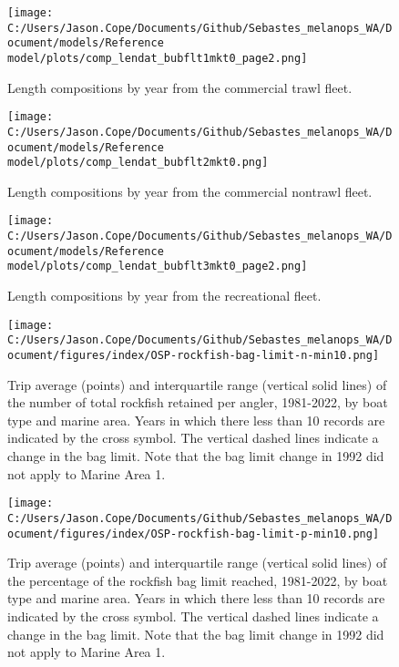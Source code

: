 \documentclass[11pt,
  english,
  letterpaper,
]{article}
\begin{document}
\pagebreak

\begin{figure}
\centering
\texttt{[image: C:/Users/Jason.Cope/Documents/Github/Sebastes\_melanops\_WA/Document/models/Reference model/plots/comp\_lendat\_bubflt1mkt0\_page2.png]}
\caption{Length compositions by year from the commercial trawl fleet.\label{fig:trawl-length-comps}}
\end{figure}

\pagebreak

\begin{figure}
\centering
\texttt{[image: C:/Users/Jason.Cope/Documents/Github/Sebastes\_melanops\_WA/Document/models/Reference model/plots/comp\_lendat\_bubflt2mkt0.png]}
\caption{Length compositions by year from the commercial nontrawl fleet.\label{fig:nontrawl-length-comps}}
\end{figure}

\pagebreak

\begin{figure}
\centering
\texttt{[image: C:/Users/Jason.Cope/Documents/Github/Sebastes\_melanops\_WA/Document/models/Reference model/plots/comp\_lendat\_bubflt3mkt0\_page2.png]}
\caption{Length compositions by year from the recreational fleet.\label{fig:rec-length-comps}}
\end{figure}

\pagebreak

\begin{figure}
\centering
\texttt{[image: C:/Users/Jason.Cope/Documents/Github/Sebastes\_melanops\_WA/Document/figures/index/OSP-rockfish-bag-limit-n-min10.png]}
\caption{Trip average (points) and interquartile range (vertical solid lines) of the number of total rockfish retained per angler, 1981-2022, by boat type and marine area. Years in which there less than 10 records are indicated by the cross symbol. The vertical dashed lines indicate a change in the bag limit. Note that the bag limit change in 1992 did not apply to Marine Area 1.\label{fig:baglimit_numbers}}
\end{figure}

\pagebreak

\begin{figure}
\centering
\texttt{[image: C:/Users/Jason.Cope/Documents/Github/Sebastes\_melanops\_WA/Document/figures/index/OSP-rockfish-bag-limit-p-min10.png]}
\caption{Trip average (points) and interquartile range (vertical solid lines) of the percentage of the rockfish bag limit reached, 1981-2022, by boat type and marine area. Years in which there less than 10 records are indicated by the cross symbol. The vertical dashed lines indicate a change in the bag limit. Note that the bag limit change in 1992 did not apply to Marine Area 1.\label{fig:baglimit_percentage}}
\end{figure}
\end{document}
